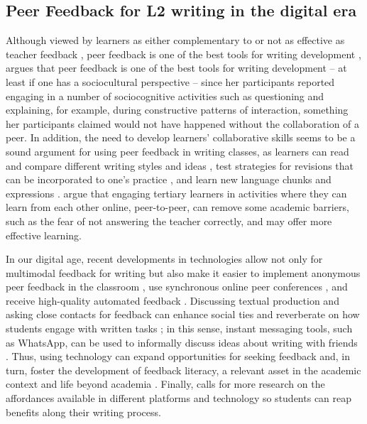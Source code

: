 \documentclass[english]{textolivre}
\begin{document}
\subsection{Peer Feedback for L2 writing in the digital era}

Although viewed by learners as either complementary to or not as effective as teacher feedback \cite{chang}, peer feedback is one of the best tools for writing development \cite{min2005training}, \textcite{min2005training} argues that peer feedback is one of the best tools for writing development – at least if one has a sociocultural \cite{vygotsky1997} perspective – since her participants reported engaging in a number of sociocognitive activities such as questioning and explaining, for example, during constructive patterns of interaction, something her participants claimed would not have happened without the collaboration of a peer. In addition, the need to develop learners’ collaborative skills \cite{santos2021kersch} seems to be a sound argument for using peer feedback in writing classes, as learners can read and compare different writing styles and ideas \cite{zaccaron2020desenvolvimento}, test strategies for revisions that can be incorporated to one’s practice \cite{ho2007face}, and learn new language chunks and expressions \cite{zhang2022fostering}. \textcite{chandra2021online} argue that engaging tertiary learners in activities where they can learn from each other online, peer-to-peer, can remove some academic barriers, such as the fear of not answering the teacher correctly, and may offer more effective learning.

In our digital age, recent developments in technologies allow not only for multimodal feedback for writing \cite{bakla2020extensive, elola2017writing} but also make it easier to implement anonymous peer feedback in the classroom \cite{li2018turnitin}, use synchronous online peer conferences \cite{li2021computer}, and receive high-quality automated feedback \cite{ranalli2021l2}. Discussing textual production and asking close contacts for feedback can enhance social ties and reverberate on how students engage with written tasks \cite{bankier2022socialization}; in this sense, instant messaging tools, such as WhatsApp, can be used to informally discuss ideas about writing with friends \cite{umamah2022efl}. Thus, using technology can expand opportunities for seeking feedback \cite{ccolak2022use} and, in turn, foster the development of feedback literacy, a relevant asset in the academic context and life beyond academia \cite{carless2018development}. Finally, \textcite{li2021computer} calls for more research on the affordances available in different platforms and technology so students can reap benefits along their writing process.
\end{document}
